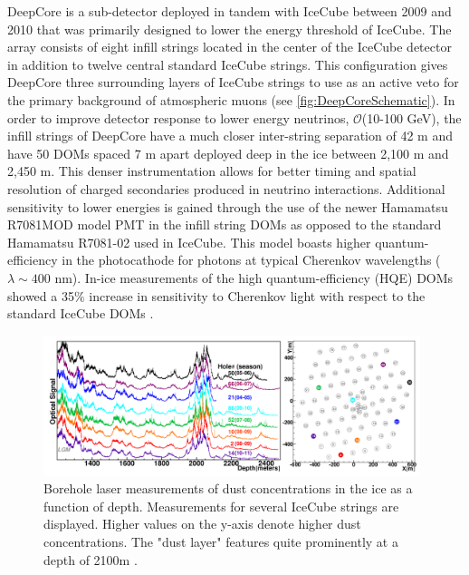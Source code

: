 \documentclass{gatech-thesis}
\begin{document}
DeepCore \cite{2012APh....35..615A} is a sub-detector deployed in tandem with IceCube between 2009 and 2010 that was primarily designed to lower the energy threshold of IceCube. The array consists of eight infill strings located in the center of the IceCube detector in addition to twelve central standard IceCube strings. This configuration gives DeepCore three surrounding layers of IceCube strings to use as an active veto for the primary background of atmospheric muons (see \ref{fig:DeepCoreSchematic}). In order to improve detector response to lower energy neutrinos, $\mathcal{O}$(10-100 GeV), the infill strings of DeepCore have a much closer inter-string separation of 42 m and have 50 DOMs spaced 7 m apart deployed deep in the ice between 2,100 m and 2,450 m. This denser instrumentation allows for better timing and spatial resolution of charged secondaries produced in neutrino interactions. Additional sensitivity to lower energies is gained through the use of the newer Hamamatsu R7081MOD model PMT in the infill string DOMs as opposed to the standard Hamamatsu R7081-02 used in IceCube. This model boasts higher quantum-efficiency in the photocathode for photons at typical Cherenkov wavelengths ($\lambda \sim 400$ nm). In-ice measurements of the high quantum-efficiency (HQE) DOMs showed a 35$\%$ increase in sensitivity to Cherenkov light with respect to the standard IceCube DOMs \cite{2012APh....35..615A}.

\begin{figure}[ht]
  \begin{center}
    \includegraphics[width=0.98\textwidth,keepaspectratio]{BoreholeLaserDustLogging.png}
  \end{center}
  \caption[Borehole Dust Concentration Measurements]{Borehole laser measurements of dust concentrations in the ice as a function of depth. Measurements for several IceCube strings are displayed. Higher values on the y-axis denote higher dust concentrations. The "dust layer" features quite prominently at a depth of 2100m \cite{2013JGlac..59.1117.}.}
  \label{fig:DustLogger}
\end{figure}
\end{document}
